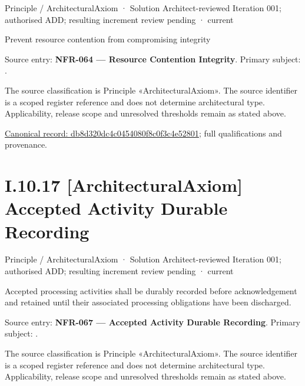 \label{element:db8d320dc4c0454080f8c0f3c4e52801}
{\small Principle / ArchitecturalAxiom · Solution Architect-reviewed Iteration 001; authorised ADD; resulting increment review pending · current}\par

Prevent resource contention from compromising integrity



Source entry: \textbf{NFR-064 — Resource Contention Integrity}. Primary subject: \texttt{}.



The source classification is Principle «ArchitecturalAxiom». The source identifier is a scoped register reference and does not determine architectural type. Applicability, release scope and unresolved thresholds remain as stated above.


{\footnotesize \href{../../../../../../../../continuum/motivation/principle/architectural-axiom/db8d320dc4c0454080f8c0f3c4e52801.md}{Canonical record: db8d320dc4c0454080f8c0f3c4e52801}; full qualifications and provenance.}\par
\section*{I.10.17 [ArchitecturalAxiom] Accepted Activity Durable Recording}
\label{navigation:I.10.17}

\label{element:6ee491b8c08d41868c3a7652fb794756}
{\small Principle / ArchitecturalAxiom · Solution Architect-reviewed Iteration 001; authorised ADD; resulting increment review pending · current}\par

Accepted processing activities shall be durably recorded before acknowledgement and retained until their associated processing obligations have been discharged.



Source entry: \textbf{NFR-067 — Accepted Activity Durable Recording}. Primary subject: \texttt{}.



The source classification is Principle «ArchitecturalAxiom». The source identifier is a scoped register reference and does not determine architectural type. Applicability, release scope and unresolved thresholds remain as stated above.


